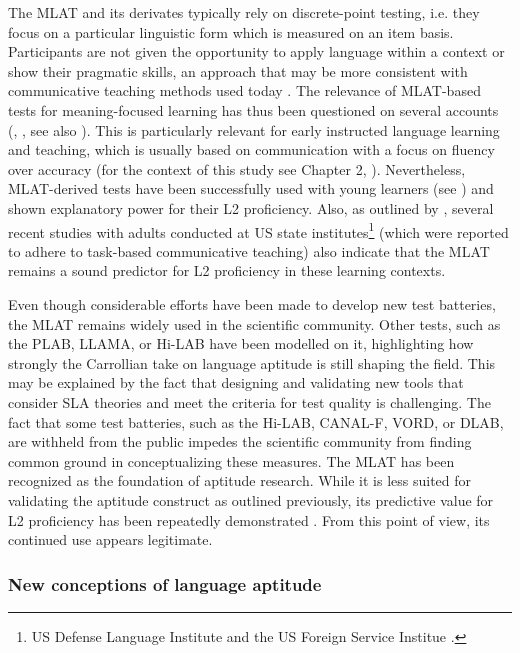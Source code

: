 \documentclass[output=paper]{langscibook}
\begin{document}
The MLAT and its derivates typically rely on discrete-point testing, i.e. they focus on a particular linguistic form which is measured on an item basis. Participants are not given the opportunity to apply language within a context or show their pragmatic skills, an approach that may be more consistent with communicative teaching methods used today \citep{Singleton2017}. The relevance of MLAT-based tests for meaning-focused learning has thus been questioned on several accounts (\citealt{Krashen1981}, \citealt{Stansfield1989}, see also \citealt{Singleton2017}). This is particularly relevant for early instructed language learning and teaching, which is usually based on communication with a focus on fluency over accuracy (for the context of this study see Chapter 2, ). Nevertheless, MLAT-derived tests have been successfully used with young learners (see ) and shown explanatory power for their L2 proficiency. Also, as outlined by \citet{StansfieldReed2019}, several recent studies with adults conducted at US state institutes\footnote{US Defense Language Institute \citep{Winke2013} and the US Foreign Service Institue \citep{Ehrman1998}.} (which were reported to adhere to task-based communicative teaching) also indicate that the MLAT remains a sound predictor for L2 proficiency in these learning contexts.\largerpage

Even though considerable efforts have been made to develop new test batteries, the MLAT remains widely used in the scientific community. Other tests, such as the PLAB, LLAMA, or Hi-LAB have been modelled on it, highlighting how strongly the Carrollian take on language aptitude is still shaping the field. This may be explained by the fact that designing and validating new tools that consider SLA theories and meet the criteria for test quality is challenging. The fact that some test batteries, such as the Hi-LAB, CANAL-F, VORD, or DLAB, are withheld from the public \citep{AmeringerEtAl2019} impedes the scientific community from finding common ground in conceptualizing these measures. The MLAT has been recognized as the foundation of aptitude research. While it is less suited for validating the aptitude construct as outlined previously, its predictive value for L2 proficiency has been repeatedly demonstrated \citep{Li2016}. From this point of view, its continued use appears legitimate.

\subsubsection{New conceptions of language aptitude}\label{sec:01:2.1.3}%
\end{document}
